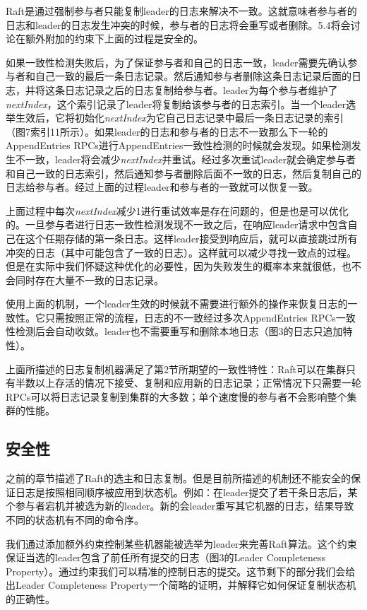\documentclass[journal]{IEEEtran}
\begin{document}
Raft是通过强制参与者只能复制leader的日志来解决不一致。这就意味者参与者的日志和leader的日志发生冲突的时候，参与者的日志将会重写或者删除。5.4将会讨论在额外附加的约束下上面的过程是安全的。

如果一致性检测失败后，为了保证参与者和自己的日志一致，leader需要先确认参与者和自己一致的最后一条日志记录。然后通知参与者删除这条日志记录后面的日志，并将这条日志记录之后的日志复制给参与者。leader为每个参与者维护了\textit{nextIndex}，这个索引记录了leader将复制给该参与者的日志索引。当一个leader选举生效后，它将初始化\textit{nextIndex}为它自己日志记录中最后一条日志记录的索引（图7索引11所示）。如果leader的日志和参与者的日志不一致那么下一轮的AppendEntries RPCs进行AppendEntries一致性检测的时候就会发现。如果检测发生不一致，leader将会减少\textit{nextIndex}并重试。经过多次重试leader就会确定参与者和自己一致的日志索引，然后通知参与者删除后面不一致的日志，然后复制自己的日志给参与者。经过上面的过程leader和参与者的一致就可以恢复一致。

上面过程中每次\textit{nextIndex}减少1进行重试效率是存在问题的，但是也是可以优化的。一旦参与者进行日志一致性检测发现不一致之后，在响应leader请求中包含自己在这个任期存储的第一条日志。这样leader接受到响应后，就可以直接跳过所有冲突的日志（其中可能包含了一致的日志）。这样就可以减少寻找一致点的过程。但是在实际中我们怀疑这种优化的必要性，因为失败发生的概率本来就很低，也不会同时存在大量不一致的日志记录。

使用上面的机制，一个leader生效的时候就不需要进行额外的操作来恢复日志的一致性。它只需按照正常的流程，日志的不一致经过多次AppendEntries RPCs一致性检测后会自动收敛。leader也不需要重写和删除本地日志（图3的日志只追加特性）。

上面所描述的日志复制机器满足了第2节所期望的一致性特性：Raft可以在集群只有半数以上存活的情况下接受、复制和应用新的日志记录；正常情况下只需要一轮RPCs可以将日志记录复制到集群的大多数；单个速度慢的参与者不会影响整个集群的性能。

\subsection{安全性}
之前的章节描述了Raft的选主和日志复制。但是目前所描述的机制还不能安全的保证日志是按照相同顺序被应用到状态机。例如：在leader提交了若干条日志后，某个参与者宕机并被选为新的leader。新的会leader重写其它机器的日志，结果导致不同的状态机有不同的命令序。

我们通过添加额外约束控制某些机器能被选举为leader来完善Raft算法。这个约束保证当选的leader包含了前任所有提交的日志（图3的Leader Completeness Property）。通过约束我们可以精准的控制日志的提交。这节剩下的部分我们会给出Leader Completeness Property一个简略的证明，并解释它如何保证复制状态机的正确性。
\end{document}
